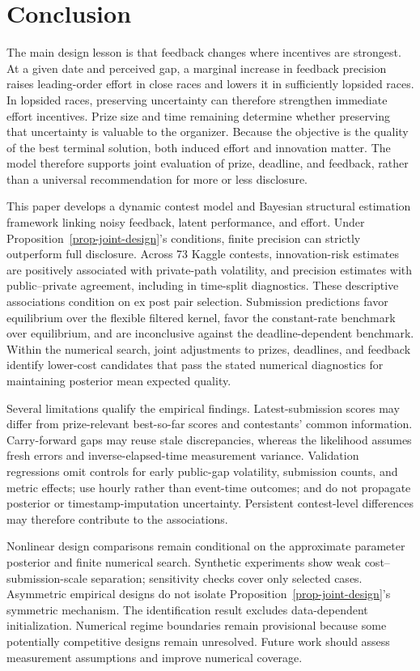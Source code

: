\documentclass[mnsc]{informs3}
\begin{document}
\section{Conclusion}

{The main design lesson is that feedback changes where incentives are strongest. {At a given date and perceived gap, a marginal increase in feedback precision raises leading-order effort in close races and lowers it in sufficiently lopsided races. In lopsided races, preserving uncertainty can therefore strengthen immediate effort incentives.} Prize size and time remaining determine whether preserving that uncertainty is valuable to the organizer. Because the objective is the quality of the best terminal solution, both induced effort and innovation matter. The model therefore supports joint evaluation of prize, deadline, and feedback, rather than a universal recommendation for more or less disclosure.}

{This paper develops a dynamic contest model and Bayesian structural estimation framework linking noisy feedback, latent performance, and effort. Under Proposition~\ref{prop-joint-design}'s conditions, finite precision can strictly outperform full disclosure. Across 73 Kaggle contests, innovation-risk estimates are positively associated with private-path volatility, and precision estimates with public--private agreement, including in time-split diagnostics. These descriptive associations condition on ex post pair selection. Submission predictions favor equilibrium over the flexible filtered kernel, favor the constant-rate benchmark over equilibrium, and are inconclusive against the deadline-dependent benchmark. {Within the numerical search, joint adjustments to prizes, deadlines, and feedback identify lower-cost candidates that pass the stated numerical diagnostics for maintaining posterior mean expected quality.}}

{Several limitations qualify the empirical findings. Latest-submission scores may differ from prize-relevant best-so-far scores and contestants' common information. Carry-forward gaps may reuse stale discrepancies, whereas the likelihood assumes fresh errors and inverse-elapsed-time measurement variance. Validation regressions omit controls for early public-gap volatility, submission counts, and metric effects; use hourly rather than event-time outcomes; and do not propagate posterior or timestamp-imputation uncertainty. Persistent contest-level differences may therefore contribute to the associations.}

{Nonlinear design comparisons remain conditional on the approximate parameter posterior and finite numerical search. Synthetic experiments show weak cost--submission-scale separation; sensitivity checks cover only selected cases. Asymmetric empirical designs do not isolate Proposition~\ref{prop-joint-design}'s symmetric mechanism. The identification result excludes data-dependent initialization. Numerical regime boundaries remain provisional because some potentially competitive designs remain unresolved. Future work should assess measurement assumptions and improve numerical coverage.}
\end{document}
